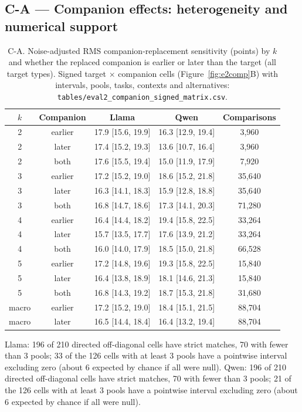\subsection*{C-A --- Companion effects: heterogeneity and numerical support}
\begin{table}[h]
\centering\scriptsize
\caption{C-A. Noise-adjusted RMS companion-replacement sensitivity (points) by $k$ and whether the replaced companion is earlier or later than the target (all target types). Signed target $\times$ companion cells (Figure~\ref{fig:e2comp}B) with intervals, pools, tasks, contexts and alternatives: \texttt{tables/eval2\_companion\_signed\_matrix.csv}.}
\label{tab:CA}
\begin{tabular}{ccccc}
\toprule
$k$ & Companion & Llama & Qwen & Comparisons \\
\midrule
2 & earlier & 17.9 [15.6, 19.9] & 16.3 [12.9, 19.4] & 3,960 \\
2 & later & 17.4 [15.2, 19.3] & 13.6 [10.7, 16.4] & 3,960 \\
2 & both & 17.6 [15.5, 19.4] & 15.0 [11.9, 17.9] & 7,920 \\
3 & earlier & 17.2 [15.2, 19.0] & 18.6 [15.2, 21.8] & 35,640 \\
3 & later & 16.3 [14.1, 18.3] & 15.9 [12.8, 18.8] & 35,640 \\
3 & both & 16.8 [14.7, 18.6] & 17.3 [14.1, 20.3] & 71,280 \\
4 & earlier & 16.4 [14.4, 18.2] & 19.4 [15.8, 22.5] & 33,264 \\
4 & later & 15.7 [13.5, 17.7] & 17.6 [13.9, 21.2] & 33,264 \\
4 & both & 16.0 [14.0, 17.9] & 18.5 [15.0, 21.8] & 66,528 \\
5 & earlier & 17.2 [14.8, 19.6] & 19.3 [15.8, 22.5] & 15,840 \\
5 & later & 16.4 [13.8, 18.9] & 18.1 [14.6, 21.3] & 15,840 \\
5 & both & 16.8 [14.3, 19.2] & 18.7 [15.3, 21.8] & 31,680 \\
macro & earlier & 17.2 [15.2, 19.0] & 18.4 [15.1, 21.5] & 88,704 \\
macro & later & 16.5 [14.4, 18.4] & 16.4 [13.2, 19.4] & 88,704 \\
\bottomrule
\end{tabular}
\end{table}

Llama: 196 of 210 directed off-diagonal cells have strict matches, 70 with fewer than 3 pools; 33 of the 126 cells with at least 3 pools have a pointwise interval excluding zero (about 6 expected by chance if all were null). Qwen: 196 of 210 directed off-diagonal cells have strict matches, 70 with fewer than 3 pools; 21 of the 126 cells with at least 3 pools have a pointwise interval excluding zero (about 6 expected by chance if all were null).

